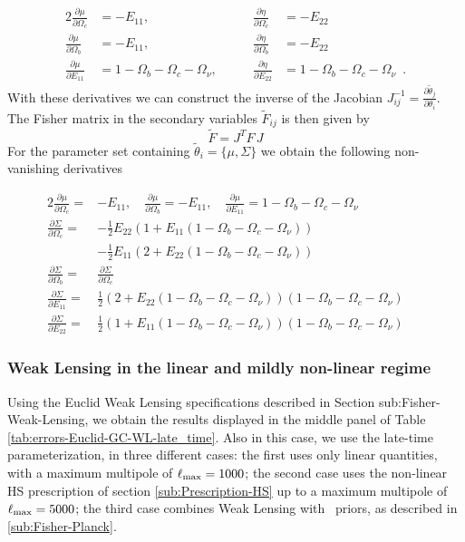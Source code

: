 \begin{alignat}{2}
\frac{\partial\mu}{\partial\Omega_{c}} & =-E_{11},\qquad &
\frac{\partial\eta}{\partial\Omega_{c}} & =-E_{22}\\
\frac{\partial\mu}{\partial\Omega_{b}} & =-E_{11},\qquad &
\frac{\partial\eta}{\partial\Omega_{b}} & =-E_{22}\\
\frac{\partial\mu}{\partial E_{11}} &
=1-\Omega_{b}-\Omega_{c}-\Omega_{\nu},\qquad & \frac{\partial\eta}{\partial
	E_{22}} & =1-\Omega_{b}-\Omega_{c}-\Omega_{\nu} \,\,\, .
\end{alignat}
With these derivatives we can construct the inverse of the Jacobian
$J_{ij}^{-1}=\frac{\partial\tilde{\theta}_{j}}{\partial\theta_{i}}$.
The Fisher matrix in the secondary variables $\tilde{F}{}_{ij}$ is
then given by 
\begin{equation}
\tilde{F}=J^{T}F\,J
\end{equation}
For the parameter set containing $\tilde{\theta}_{i}=\{\mu,\Sigma\}$
we obtain the following non-vanishing derivatives \done{}

\begin{alignat}{2}
\frac{\partial\mu}{\partial\Omega_{c}}  = & -E_{11}, \quad \frac{\partial\mu}{\partial\Omega_{b}}  =-E_{11} ,\quad \frac{\partial\mu}{\partial E_{11}} 
=1-\Omega_{b}-\Omega_{c}-\Omega_{\nu} & &\\
\frac{\partial\Sigma}{\partial\Omega_{c}} 
= & -\frac{1}{2}E_{22}(1+E_{11}(1-\Omega_{b}-\Omega_{c}-\Omega_{\nu})) & &\\
  & -\frac{1}{2}E_{11}(2+E_{22}(1-\Omega_{b}-\Omega_{c}-\Omega_{\nu})) &  & \nonumber \\
\frac{\partial\Sigma}{\partial\Omega_{b}}
= &  \frac{\partial\Sigma}{\partial\Omega_{c}}  \\
\frac{\partial\Sigma}{\partial E_{11}} 
= & \frac{1}{2}(2+E_{22}(1-\Omega_{b}-\Omega_{c}-\Omega_{\nu}))
(1-\Omega_{b}-\Omega_{c}-\Omega_{\nu}) & & \\
\frac{\partial\Sigma}{\partial E_{22}} 
= & \frac{1}{2}(1+E_{11}(1-\Omega_{b}-\Omega_{c}-\Omega_{\nu}))
(1-\Omega_{b}-\Omega_{c}-\Omega_{\nu}) & &
\end{alignat}

\subsubsection{Weak Lensing in the linear and mildly non-linear regime}

Using the Euclid Weak Lensing specifications described in Section
sub:Fisher-Weak-Lensing, we obtain the results displayed in
the middle panel of Table \ref{tab:errors-Euclid-GC-WL-late_time}. 
Also in this case, we use the late-time parameterization, in three different cases: 
the first uses only linear quantities, with a maximum multipole of $\ell_{\rm max}=1000$; 
the second case uses the non-linear HS prescription of section \ref{sub:Prescription-HS} 
up to a maximum multipole of $\ell_{\rm max}=5000$; the third case combines Weak Lensing with \planck\ priors, 
as described in \ref{sub:Fisher-Planck}.

